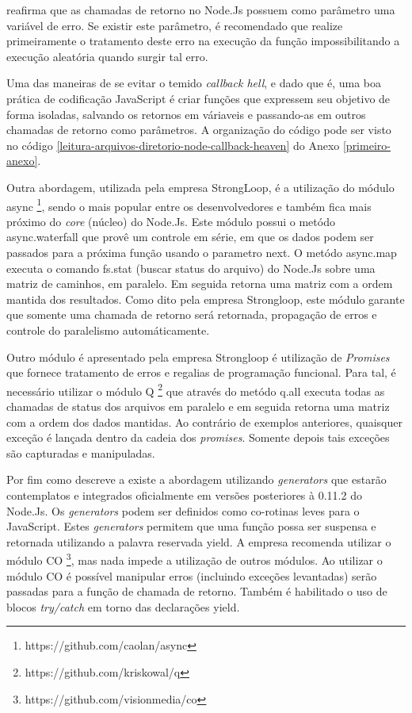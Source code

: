    reafirma que as chamadas de retorno no Node.Js possuem como parâmetro uma variável de erro. Se existir
  este parâmetro, é recomendado que realize primeiramente o tratamento deste erro na execução da função
  impossibilitando a execução aleatória quando surgir tal erro.
  
  Uma das maneiras de se evitar o temido \textit{callback hell}, e dado que é, uma boa prática de codificação JavaScript é
  criar funções que expressem seu objetivo de forma isoladas, salvando os retornos em váriaveis e passando-as em outros
  chamadas de retorno como parâmetros. A organização do código pode ser visto no código \ref{leitura-arquivos-diretorio-node-callback-heaven} do
  Anexo \ref{primeiro-anexo}.\cite{Pereira:2013}
 
  Outra abordagem, utilizada pela empresa StrongLoop, é a utilização do módulo async \footnote{https://github.com/caolan/async},
  sendo o mais popular entre os desenvolvedores e também fica mais próximo do \textit{core} (núcleo) do Node.Js. Este módulo
  possui o metódo async.waterfall que provê um controle em série, em que os dados podem ser passados para a próxima função
  usando o parametro next. O metódo async.map executa o comando fs.stat (buscar status do arquivo) do Node.Js sobre uma matriz
  de caminhos, em paralelo. Em seguida retorna uma matriz com a ordem mantida dos resultados. Como dito pela empresa
  Strongloop, este módulo garante que somente uma chamada de retorno será retornada, propagação de erros e controle do 
  paralelismo automáticamente. 
  
  Outro módulo é apresentado pela empresa Strongloop é utilização de \textit{Promises} que fornece tratamento de erros
  e regalias de programação funcional. Para tal, é necessário utilizar o módulo Q \footnote{https://github.com/kriskowal/q}
  que através do metódo q.all executa todas as chamadas de status dos arquivos em paralelo e em seguida retorna uma matriz
  com a ordem dos dados mantidas. Ao contrário de exemplos anteriores, quaisquer exceção é lançada dentro da cadeia dos
  \textit{promises}. Somente depois tais exceções são capturadas e manipuladas.
  
  Por fim como descreve a  existe a abordagem utilizando \textit{generators} que estarão
  contemplatos e integrados oficialmente em versões posteriores à 0.11.2 do Node.Js. Os \textit{generators} podem ser definidos
  como co-rotinas leves para o JavaScript. Estes \textit{generators} permitem que uma função possa ser suspensa e retornada
  utilizando a palavra reservada yield. A empresa recomenda utilizar o módulo CO \footnote{https://github.com/visionmedia/co},
  mas nada impede a utilização de outros módulos. Ao utilizar o módulo CO é possível manipular erros (incluindo exceções levantadas)
  serão passadas para a função de chamada de retorno. Também é habilitado o uso de blocos \textit{try/catch} em torno das 
  declarações yield.
  
